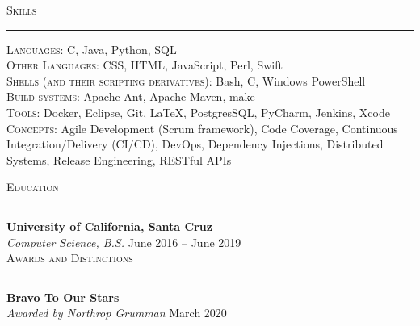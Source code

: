 \documentclass{res}
\begin{document}
\begin{resume}
\textsc{{\Large Skills}}
\vspace{0.5mm}
\hrule width18.5cm
	\textsc{Languages:} C, Java, Python, SQL\\[2mm]
  \textsc{Other Languages:} CSS, HTML, JavaScript, Perl, Swift\\[2mm]
  \textsc{Shells (and their scripting derivatives):} Bash, C, Windows PowerShell\\[2mm]
  \textsc{Build systems:} Apache Ant, Apache Maven, make\\[2mm]
  \textsc{Tools:} Docker, Eclipse, Git, \LaTeX, PostgresSQL, PyCharm, Jenkins, Xcode\\[2mm]
  \textsc{Concepts:} Agile Development (Scrum framework), Code Coverage, Continuous Integration/Delivery (CI/CD), DevOps, Dependency Injections, Distributed Systems, Release Engineering, RESTful APIs\\[0.5mm]
\vspace{-4mm}

\textsc{{\Large Education}}
\vspace{0.5mm}
\hrule width18.5cm
\textbf{University of California, Santa Cruz}\\
\textit{Computer Science, B.S.}
\hfill
June 2016 -- June 2019\\

\textsc{{\Large Awards and Distinctions}}
\vspace{0.5mm}
\hrule width18.5cm
\textbf{Bravo To Our Stars}\\
\textit{Awarded by Northrop Grumman}
\hfill
March 2020\\
\vspace{-2mm}
\end{resume}
\end{document}
